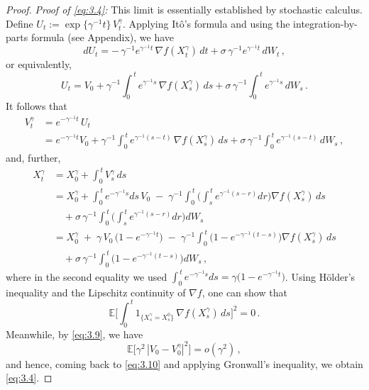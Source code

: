 \documentclass[12pt]{article}
\numberwithin{equation}{section}
\theoremstyle{remark}
\begin{document}
\begin{proof}
\noindent \textit{Proof of \eqref{eq:3.4}:} This limit is essentially established by stochastic calculus. Define $U_t := \exp\{\gamma^{-1}t\}\,V_t^\gamma$. Applying Itô’s formula and using the integration-by-parts formula (see Appendix), we have 
\[ 
dU_t = -\,\gamma^{-1}e^{\gamma^{-1}t}\,\nabla f(X_t^\gamma)\,dt + \sigma\,\gamma^{-1}e^{\gamma^{-1}t}\,dW_t\,,
\] 
or equivalently, 
\[ 
U_t = V_0 + \gamma^{-1}\int_{0}^{\,t} e^{\gamma^{-1}s}\,\nabla f(X_s^\gamma)\,ds + \sigma\,\gamma^{-1}\int_{0}^{\,t} e^{\gamma^{-1}s}\,dW_s\,.
\] 
It follows that 
\begin{equation}\label{eq:3.9}
\begin{aligned}
V_t^\gamma &= e^{-\gamma^{-1}t}\,U_t \\
&= e^{-\gamma^{-1}t}V_0 + \gamma^{-1}\int_{0}^{\,t} e^{\gamma^{-1}(s - t)}\,\nabla f(X_s^\gamma)\,ds + \sigma\,\gamma^{-1}\int_{0}^{\,t} e^{\gamma^{-1}(s - t)}\,dW_s\,,
\end{aligned}
\end{equation} 
and, further, 
\begin{align}
X_t^\gamma &= X_0^\gamma + \int_{0}^{\,t} V_s^\gamma\,ds \nonumber\\
&= X_0^\gamma + \int_{0}^{\,t} e^{-\gamma^{-1}s}ds\,V_0 \;-\; \gamma^{-1}\int_{0}^{\,t} \Bigg(\int_{s}^{\,t} e^{\gamma^{-1}(s-r)}dr\Bigg)\nabla f(X_s^\gamma)\,ds \nonumber\\ 
&\quad + \sigma\,\gamma^{-1}\int_{0}^{\,t} \Bigg(\int_{s}^{\,t} e^{\gamma^{-1}(s-r)}dr\Bigg) dW_s \nonumber\\ 
&= X_0^\gamma \;+\; \gamma\,V_0\,\big(1 - e^{-\gamma^{-1}t}\big) \;-\; \gamma^{-1}\int_{0}^{\,t} \Big(1 - e^{-\gamma^{-1}(t-s)}\Big)\nabla f(X_s^\gamma)\,ds \nonumber\\ 
&\quad + \sigma\,\gamma^{-1}\int_{0}^{\,t} \Big(1 - e^{-\gamma^{-1}(t-s)}\Big) dW_s\,,
\label{eq:3.10}
\end{align}
where in the second equality we used $\int_{0}^{\,t} e^{-\gamma^{-1}s}ds = \gamma\big(1 - e^{-\gamma^{-1}t}\big)$. Using Hölder’s inequality and the Lipschitz continuity of $\nabla f$, one can show that 
\[ 
\mathbb{E}\!\Bigg[\int_{0}^{\,t} 1_{\{X_s^\gamma = X_s^0\}}\,\nabla f(X_s^\gamma)\,ds\Bigg]^2 = 0\,.
\] 
Meanwhile, by \eqref{eq:3.9}, we have 
\[ 
\mathbb{E}\big[\gamma^2\,|V_0 - V_0^\gamma|^2\big] = o(\gamma^2)\,,
\] 
and hence, coming back to \eqref{eq:3.10} and applying Gronwall’s inequality, we obtain \eqref{eq:3.4}.


\end{proof}
\end{document}
